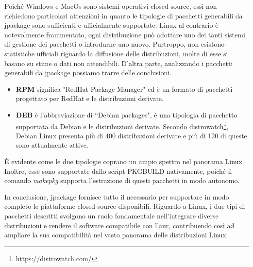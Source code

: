 Poiché Windows e MacOs sono sistemi operativi closed-source, essi non richiedono particolari attenzioni in quanto le tipologie di pacchetti generabili da jpackage sono sufficienti e ufficialmente supportate. Linux al contrario è notevolmente frammentato, ogni distribuzione può adottare uno dei tanti sistemi di gestione dei pacchetti o introdurne uno nuovo. Purtroppo, non esistono statistiche ufficiali riguardo la diffusione delle distribuzioni, molte di esse si basano su stime o dati non attendibili. D'altra parte, analizzando i pacchetti generabili da jpackage possiamo trarre delle conclusioni.
\begin{itemize}
	\item \textbf{RPM} significa "RedHat Package Manager" ed è un formato di pacchetti progettato per RedHat e le distribuzioni derivate. 
	\item \textbf{DEB} è l'abbreviazione di ``Debian packages", è una tipologia di pacchetto supportata da Debian e le distribuzioni derivate. Secondo distrowatch\footnote{https://distrowatch.com/}, Debian Linux presenta più di 400 distribuzioni derivate e più di 120 di queste sono attualmente attive.
\end{itemize}
È evidente come le due tipologie coprano un ampio spettro nel panorama Linux. Inoltre, esse sono supportate dallo script PKGBUILD nativamente, poiché il comando \textit{makepkg} supporta l'estrazione di questi pacchetti in modo autonomo. 

In conclusione, jpackage fornisce tutto il necessario per supportare in modo completo le piattaforme closed-source disponibili. Riguardo a Linux, i due tipi di pacchetti descritti svolgono un ruolo fondamentale nell'integrare diverse distribuzioni e rendere il software compatibile con l'\ac{aur}, contribuendo così ad ampliare la sua compatibilità nel vasto panorama delle distribuzioni Linux.
